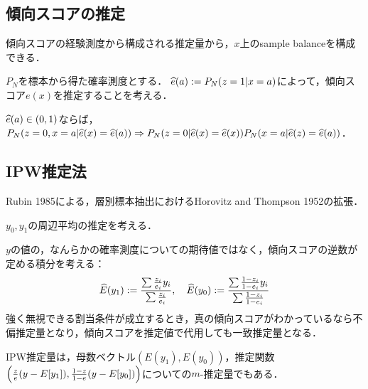 \documentclass[uplatex,dvipdfmx]{jsreport}
\begin{document}
\subsection{傾向スコアの推定}

\begin{tcolorbox}[colframe=ForestGreen, colback=ForestGreen!10!white,breakable,colbacktitle=ForestGreen!40!white,coltitle=black,fonttitle=\bfseries\sffamily,
title=]
    傾向スコアの経験測度から構成される推定量から，$x$上のsample balanceを構成できる．
\end{tcolorbox}

\begin{definition}
    $P_N$を標本から得た確率測度とする．
    $\widehat{e}(a):=P_N(z=1|x=a)$によって，傾向スコア$e(x)$を推定することを考える．
\end{definition}

\begin{theorem}
    $\widehat{e}(a)\in(0,1)$ならば，$P_N(z=0,x=a|\widehat{e}(x)=\widehat{e}(a))\Rightarrow P_N(z=0|\widehat{e}(x)=\widehat{e}(x))P_N(x=a|\widehat{e}(z)=\widehat{e}(a))$．
\end{theorem}

\subsection{IPW推定法}

\begin{tcolorbox}[colframe=ForestGreen, colback=ForestGreen!10!white,breakable,colbacktitle=ForestGreen!40!white,coltitle=black,fonttitle=\bfseries\sffamily,
title=]
    Rubin 1985による，層別標本抽出におけるHorovitz and Thompson 1952の拡張．
\end{tcolorbox}

\begin{definition}
    $y_0,y_1$の周辺平均の推定を考える．

    $y$の値の，なんらかの確率測度についての期待値ではなく，傾向スコアの逆数が定める積分を考える：
    \[\widehat{E}(y_1):=\frac{\sum\frac{z_i}{e_i}y_i}{\sum\frac{z_i}{e_i}},\quad\widehat{E}(y_0):=\frac{\sum\frac{1-z_i}{1-e_i}y_i}{\sum\frac{1-z_i}{1-e_i}}\]
    強く無視できる割当条件が成立するとき，真の傾向スコアがわかっているなら不偏推定量となり，傾向スコアを推定値で代用しても一致推定量となる．
\end{definition}
\begin{remark}
    IPW推定量は，母数ベクトル$(E(y_1),E(y_0))$，推定関数$\left(\frac{z}{e}(y-E[y_1]),\frac{1-z}{1-e}(y-E[y_0])\right)$についての$m$-推定量でもある．
\end{remark}
\end{document}
